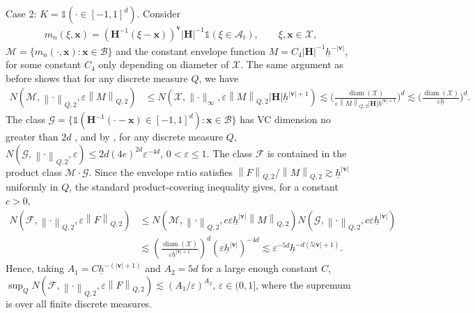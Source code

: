 \documentclass[10pt]{article}
\DeclareMathOperator{\diam}{diam}
\newcommand{\Indicator}{\mathds{1}}
\newcommand{\norm}[1]{\left\lVert#1\right\rVert}
\newcommand{\infnorm}[1]{\lVert #1 \rVert_{\infty}}
\newcommand{\bH}{\mathbf{H}}
\newcommand{\bv}{\mathbf{v}}
\newcommand{\bx}{\mathbf{x}}
\newcommand{\A}{\mathcal{A}}
\newcommand{\B}{\mathcal{B}}
\newcommand{\F}{\mathcal{F}}
\newcommand{\G}{\mathcal{G}}
\newcommand{\M}{\mathcal{M}}
\newcommand{\X}{\mathcal{X}}
\begin{document}
Case 2: $K = \Indicator(\cdot \in [-1,1]^d)$. Consider
\begin{align*}
    m_n(\xi, \bx)
    = (\bH^{-1}(\xi - \bx))^{\bv} |\bH|^{-1} \Indicator(\xi \in \A_t),
    \qquad \xi, \bx \in \mathcal{X},
\end{align*}
$\M = \{m_n(\cdot, \bx): \bx \in \B\}$ and the constant envelope function $M = C_4 |\bH|^{-1}\underline h^{-|\bv|}$, for some constant $C_4$ only depending on diameter of $\X$. The same argument as before shows that for any discrete measure $Q$, we have
\begin{align*}
    N(\M, \norm{\cdot}_{Q,2}, \varepsilon \norm{M}_{Q,2})
    & \leq N(\X, \infnorm{\cdot}, \varepsilon \norm{M}_{Q,2} |\bH|\underline h^{|\bv|+1})
    \lesssim \Big(\frac{\diam(\X)}{\varepsilon \norm{M}_{Q,2} |\bH|\underline h^{|\bv|+1}}\Big)^d
    \lesssim \Big(\frac{\diam(\X)}{\varepsilon \underline h}\Big)^d.
\end{align*}
The class $\G = \{\Indicator(\bH^{-1}(\cdot - \bx) \in [-1,1]^d): \bx \in \B\}$ has VC dimension no greater than $2d$ \cite[Example 2.6.1]{van-der-Vaart-Wellner_1996_Book}, and by \citet[Theorem 2.6.4]{van-der-Vaart-Wellner_1996_Book}, for any discrete measure $Q$, $N(\G, \norm{\cdot}_{Q,2}, \varepsilon) \leq 2d (4 e)^{2d} \varepsilon^{-4d}$, $0 < \varepsilon \leq 1$. The class $\F$ is contained in the product class $\M\cdot\G$. Since the envelope ratio satisfies $\norm{F}_{Q,2}/\norm{M}_{Q,2}\gtrsim\underline h^{|\bv|}$ uniformly in $Q$, the standard product-covering inequality gives, for a constant $c>0$,
\begin{align*}
    N(\F, \norm{\cdot}_{Q,2}, \varepsilon \norm{F}_{Q,2})
    &\leq
    N(\M, \norm{\cdot}_{Q,2}, c\varepsilon \underline h^{|\bv|} \norm{M}_{Q,2})
    N(\G, \norm{\cdot}_{Q,2}, c\varepsilon \underline h^{|\bv|})\\
    &\lesssim
    \left(\frac{\diam(\X)}{\varepsilon \underline h^{|\bv|+1}}\right)^d
    (\varepsilon\underline h^{|\bv|})^{-4d}
    \lesssim
    \varepsilon^{-5d}\underline h^{-d(5|\bv|+1)}.
\end{align*}
Hence, taking $A_1 = C\underline h^{-(|\bv|+1)}$ and $A_2 = 5d$ for a large enough constant $C$, $\sup_Q N(\F, \norm{\cdot}_{Q,2}, \varepsilon \norm{F}_{Q,2}) \lesssim (A_1/ \varepsilon)^{A_2}$, $\varepsilon \in (0,1]$, where the supremum is over all finite discrete measures.
\end{document}
